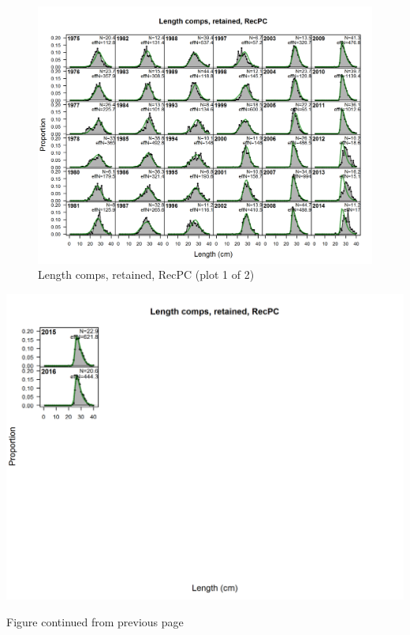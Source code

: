 \documentclass[12pt,]{article}
\begin{document}
\begin{figure}[htbp]
\centering
\includegraphics{./r4ss/plots_mod1/comp_lenfit_flt5mkt2_page1.png}
\caption{Length comps, retained, RecPC (plot 1 of 2)
\label{fig:mod1_5_comp_lenfit_flt5mkt2_page1}}
\end{figure}

\includegraphics{./r4ss/plots_mod1/comp_lenfit_flt5mkt2_page2.png}

\begin{center} 

              Figure continued from previous page 

             \end{center}
\end{document}
